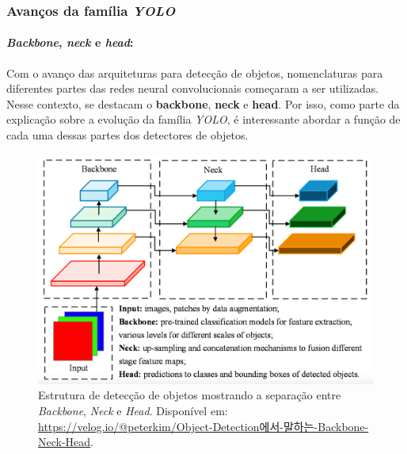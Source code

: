 \subsubsection{Avanços da família \emph{YOLO}}
\paragraph{\emph{Backbone}, \emph{neck} e \emph{head}:}
Com o avanço das arquiteturas para detecção de objetos, nomenclaturas para diferentes partes das redes neural convolucionais começaram a ser 
utilizadas. Nesse contexto, se destacam o {\bf backbone}, {\bf neck} e {\bf head}. Por isso, como parte da explicação sobre a evolução da família \emph{YOLO}, é interessante abordar a função de cada uma dessas partes dos detectores de objetos.

\begin{figure}[htb!]
    \centering
    \includegraphics[width=0.8\linewidth]{images/backbone-neck-head.png}
    \caption{\label{fig:backbone_neck_head} Estrutura de detecção de objetos mostrando a separação entre \emph{Backbone}, \emph{Neck} e \emph{Head}. Disponível em: \url{https://velog.io/@peterkim/Object-Detection에서-말하는-Backbone-Neck-Head}.}
\end{figure}

